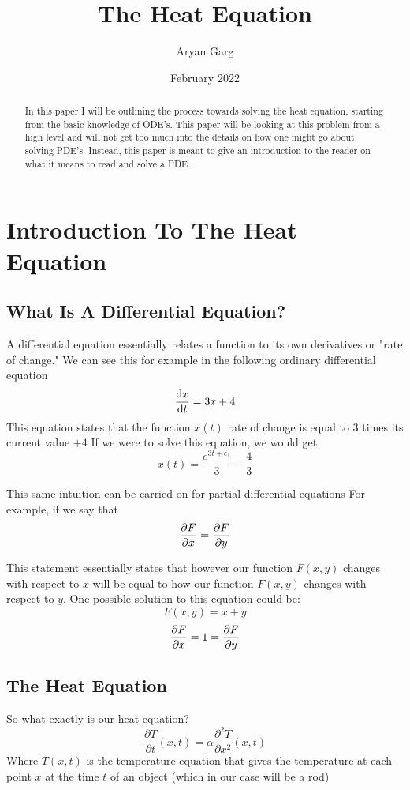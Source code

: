 \documentclass{report}
\title{The Heat Equation}
\author{Aryan Garg}
\date{February 2022}
\newcommand{\heatequation}[0]{\frac{\partial T}{\partial t}(x,t) = \alpha \frac{\partial^2 T}{\partial x^2}(x,t)}
\begin{document}
\maketitle

\begin{abstract}
    In this paper I will be outlining the process towards solving the heat equation, starting from the
    basic knowledge of ODE's. This paper will be looking at this problem from a
    high level and will not get too much into the details on how one might go about solving PDE's. 
    Instead, this paper is meant to give an introduction to the reader on what it means to read and solve a PDE.
\end{abstract}


\chapter{Introduction To The Heat Equation}
\section{What Is A Differential Equation?}

A differential equation essentially relates a function to its own derivatives or "rate of change." We can 
see this for example in the following ordinary differential equation
\[\dv{x}{t} = 3x + 4\]
This equation states that the function $x(t)$ rate of change is equal to 3 times its current value $+ 4$
If we were to solve this equation, we would get
\[x(t) = \frac{e^{3t+c_1}}{3}-\frac{4}{3} \]

This same intuition can be carried on for partial differential equations
For example, if we say that
\[ \pdv{F}{x} = \pdv{F}{y} \]

This statement essentially states that however our function $F(x,y)$ changes with respect to $x$ 
will be equal to how our function $F(x,y)$ changes with respect to $y$.
One possible solution to this equation could be:
\[F(x,y) = x+y\]
\[ \pdv{F}{x} = 1 = \pdv{F}{y} \]

\section{The Heat Equation}
So what exactly is our heat equation? 
\[ \heatequation \]
Where $T(x,t)$ is the temperature equation that gives the temperature at each point $x$ at 
the time $t$ of an object (which in our case will be a rod)
\end{document}
